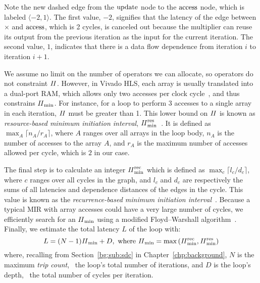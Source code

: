 Note the new dashed edge from the $\operatorname{\mathrm{update}}$ node to the $\operatorname{\mathrm{access}}$ node,
which is labeled $\langle -2, 1 \rangle$.  The first value, $-2$, signifies
that the latency of the edge between $\times$ and $\operatorname{\mathrm{access}}$, which is 2
cycles, is canceled out because the multiplier can reuse its output from the
previous iteration as the input for the current iteration. The second value,
$1$, indicates that there is a data flow dependence from iteration $i$ to
iteration $i+1$.

We assume no limit on the number of operators we can allocate, so operators
do not constraint $\mathit{II}$.  However, in Vivado HLS, each array is usually
translated into a dual-port RAM, which allows only two accesses per clock
cycle~\cite{vivado_hls}, and thus constrains $\mathit{II}_{\rm min}$.  For instance, for a
loop to perform 3 accesses to a single array in each iteration, $\mathit{II}$ must be
greater than 1.  This lower bound on $\mathit{II}$ is known as \emph{resource-based
minimum initiation interval}, $\mathit{II}_{\rm min}^{\rm res}$~\cite{rau94}. It is defined as $\max_A
\lceil {n_A}/{r_A} \rceil$, where $A$ ranges over all arrays in the loop body,
$n_A$ is the number of accesses to the array $A$, and $r_A$ is the maximum
number of accesses allowed per cycle, which is $2$ in our case.

The final step is to calculate an integer $\mathit{II}_{\rm min}^{\rm rec}$ which is defined as
$\max_c \lceil {l_c}/{d_c} \rceil$, where $c$ ranges over all cycles in
the graph, and $l_c$ and $d_c$ are respectively the sums of all latencies
and dependence distances of the edges in the cycle. This value is known
as the \emph{recurrence-based minimum initiation interval}~\cite{rau94}.
Because a typical MIR with array accesses could have a very large number of
cycles, we efficiently search for an $\mathit{II}_{\rm min}$ using a modified Floyd--Warshall
algorithm~\cite{rau94}.  Finally, we estimate the total latency $L$ of the loop
with:
\begin{equation}
    L = (N - 1) \mathit{II}_{\rm min} + D,
    \text{~where~}
        \mathit{II}_{\rm min} = \max\left(\mathit{II}_{\rm min}^{\rm rec}, \mathit{II}_{\rm min}^{\rm res}\right)
    \nonumber
\end{equation}
where, recalling from Section~\ref{bg:sub:sdc} in Chapter~\ref{chp:background},
$N$ is the maximum \emph{trip count}, \ie~the loop's total number of
iterations, and $D$ is the loop's depth, \ie~the total number of cycles per
iteration.

